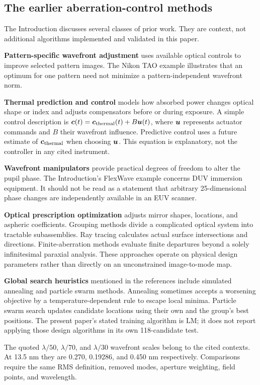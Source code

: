 \subsection{The earlier aberration-control methods}
The Introduction discusses several classes of prior work.
They are context, not additional algorithms implemented and validated
in this paper.

\textbf{Pattern-specific wavefront adjustment} uses available optical
controls to improve selected pattern images. The Nikon TAO example
illustrates that an optimum for one pattern need not minimize a
pattern-independent wavefront norm.

\textbf{Thermal prediction and control} models how absorbed power changes
optical shape or index and adjusts compensators before or during exposure.
A simple control description is
$\bm{c}(t)=\bm{c}_{\rm thermal}(t)+B\bm{u}(t)$,
where $\bm{u}$ represents actuator commands and $B$ their wavefront
influence. Predictive control uses a future estimate of
$\bm{c}_{\rm thermal}$ when choosing $\bm{u}$.
This equation is explanatory, not the controller in any cited instrument.

\textbf{Wavefront manipulators} provide practical degrees of freedom to
alter the pupil phase. The Introduction's FlexWave example concerns DUV
immersion equipment. It should not be read as a statement that arbitrary
25-dimensional phase changes are independently available in an EUV scanner.

\textbf{Optical prescription optimization} adjusts mirror shapes,
locations, and aspheric coefficients. Grouping methods divide a
complicated optical system into tractable subassemblies.
Ray tracing calculates actual surface intersections and directions.
Finite-aberration methods evaluate finite departures beyond a solely
infinitesimal paraxial analysis. These approaches operate on physical
design parameters rather than directly on an unconstrained image-to-mode map.

\textbf{Global search heuristics} mentioned in the references include
simulated annealing and particle swarm methods. Annealing sometimes
accepts a worsening objective by a temperature-dependent rule to escape
local minima. Particle swarm search updates candidate locations using
their own and the group's best positions.
The present paper's stated training algorithm is LM; it does not
report applying those design algorithms in its own 118-candidate test.

The quoted $\lambda/50$, $\lambda/70$, and $\lambda/30$ wavefront scales
belong to the cited contexts. At 13.5 nm they are 0.270, 0.19286, and
0.450 nm respectively. Comparisons require the same RMS definition,
removed modes, aperture weighting, field points, and wavelength.

